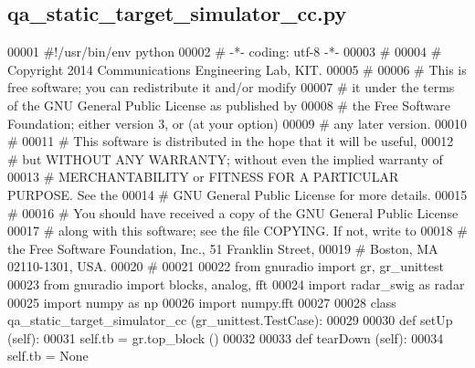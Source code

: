 \subsection{qa\+\_\+static\+\_\+target\+\_\+simulator\+\_\+cc.\+py}
\label{qa__static__target__simulator__cc_8py_source}

\begin{DoxyCode}
00001 \textcolor{comment}{#!/usr/bin/env python}
00002 \textcolor{comment}{# -*- coding: utf-8 -*-}
00003 \textcolor{comment}{# }
00004 \textcolor{comment}{# Copyright 2014 Communications Engineering Lab, KIT.}
00005 \textcolor{comment}{# }
00006 \textcolor{comment}{# This is free software; you can redistribute it and/or modify}
00007 \textcolor{comment}{# it under the terms of the GNU General Public License as published by}
00008 \textcolor{comment}{# the Free Software Foundation; either version 3, or (at your option)}
00009 \textcolor{comment}{# any later version.}
00010 \textcolor{comment}{# }
00011 \textcolor{comment}{# This software is distributed in the hope that it will be useful,}
00012 \textcolor{comment}{# but WITHOUT ANY WARRANTY; without even the implied warranty of}
00013 \textcolor{comment}{# MERCHANTABILITY or FITNESS FOR A PARTICULAR PURPOSE.  See the}
00014 \textcolor{comment}{# GNU General Public License for more details.}
00015 \textcolor{comment}{# }
00016 \textcolor{comment}{# You should have received a copy of the GNU General Public License}
00017 \textcolor{comment}{# along with this software; see the file COPYING.  If not, write to}
00018 \textcolor{comment}{# the Free Software Foundation, Inc., 51 Franklin Street,}
00019 \textcolor{comment}{# Boston, MA 02110-1301, USA.}
00020 \textcolor{comment}{# }
00021 
00022 \textcolor{keyword}{from} gnuradio \textcolor{keyword}{import} gr, gr\_unittest
00023 \textcolor{keyword}{from} gnuradio \textcolor{keyword}{import} blocks, analog, fft
00024 \textcolor{keyword}{import} radar\_swig \textcolor{keyword}{as} radar
00025 \textcolor{keyword}{import} numpy \textcolor{keyword}{as} np
00026 \textcolor{keyword}{import} numpy.fft
00027 
00028 \textcolor{keyword}{class }qa_static_target_simulator_cc (gr\_unittest.TestCase):
00029 
00030     \textcolor{keyword}{def }setUp (self):
00031         self.tb = gr.top\_block ()
00032 
00033     \textcolor{keyword}{def }tearDown (self):
00034         self.tb = \textcolor{keywordtype}{None}

\end{DoxyCode}
